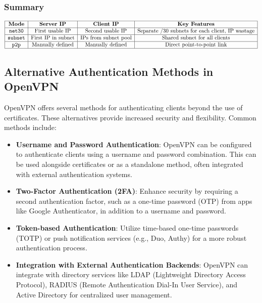 \subsubsection{Summary}
\[
\begin{array}{|c|c|c|c|}
\hline
\textbf{Mode} & \textbf{Server IP} & \textbf{Client IP} & \textbf{Key Features} \\
\hline
\texttt{net30} & \text{First usable IP} & \text{Second usable IP} & \text{Separate /30 subnets for each client, IP wastage} \\
\hline
\texttt{subnet} & \text{First IP in subnet} & \text{IPs from subnet pool} & \text{Shared subnet for all clients} \\
\hline
\texttt{p2p} & \text{Manually defined} & \text{Manually defined} & \text{Direct point-to-point link} \\
\hline
\end{array}
\]

\subsection{Alternative Authentication Methods in OpenVPN}

OpenVPN offers several methods for authenticating clients beyond the use of certificates. These alternatives provide increased security and flexibility. Common methods include:

\begin{itemize}
\item \textbf{Username and Password Authentication}: OpenVPN can be configured to authenticate clients using a username and password combination. This can be used alongside certificates or as a standalone method, often integrated with external authentication systems.
\item \textbf{Two-Factor Authentication (2FA)}: Enhance security by requiring a second authentication factor, such as a one-time password (OTP) from apps like Google Authenticator, in addition to a username and password.
\item \textbf{Token-based Authentication}: Utilize time-based one-time passwords (TOTP) or push notification services (e.g., Duo, Authy) for a more robust authentication process.
\item \textbf{Integration with External Authentication Backends}: OpenVPN can integrate with directory services like LDAP (Lightweight Directory Access Protocol), RADIUS (Remote Authentication Dial-In User Service), and Active Directory for centralized user management.
\end{itemize}


